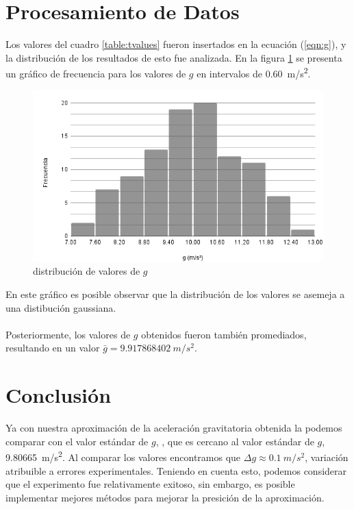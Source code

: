 \documentclass{article}
\begin{document}
\pagebreak

\section{Procesamiento de Datos}

Los valores del cuadro \ref{table:tvalues} fueron insertados en la ecuaci\'{o}n (\ref{eqn:g}), y la distribuci\'{o}n de los resultados de esto fue analizada. En la figura \ref{figure:distg} se presenta un gr\'{a}fico de frecuencia para los valores de $g$ en intervalos de \qty[mode = text]{0.60}{m/s^{2}}.

\begin{figure}[H]
\centering
\includegraphics[width=\textwidth]{images/chart1.png}
\caption{distribuci\'{o}n de valores de $g$}
\label{figure:distg}
\end{figure}

En este gr\'{a}fico es posible observar que la distribuci\'{o}n de los valores se asemeja a una distibuci\'{o}n gaussiana.
\\
\\
Posteriormente, los valores de $g$ obtenidos fueron tambi\'{e}n promediados, resultando en un valor $\bar{g}=\qty[mode = text] {9.917868402} {m/s^{2}}$.

\section{Conclusi\'{o}n}

Ya con nuestra aproximación de la aceleración gravitatoria obtenida la podemos comparar con el valor estándar de $g$, , que es cercano al valor est\'{a}ndar de $g$, \qty[mode = text] {9.80665} {m/s^{2}}. Al comparar los valores encontramos que $\Delta g\approx \qty[mode = text]{0.1}{m/s^{2}}$, variaci\'{o}n atribuible a errores experimentales. Teniendo en cuenta esto, podemos considerar que el experimento fue relativamente exitoso, sin embargo, es posible implementar mejores m\'{e}todos para mejorar la presici\'{o}n de la aproximaci\'{o}n.
\end{document}
